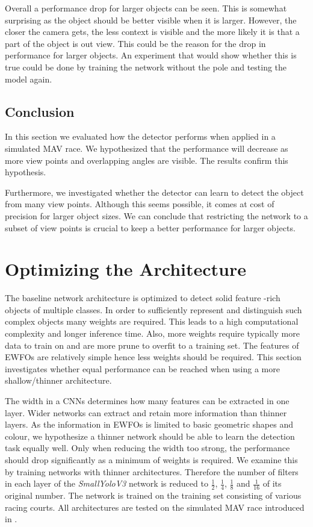 Overall a performance drop for larger objects can be seen. This is somewhat surprising as the object should be better visible when it is larger. However, the closer the camera gets, the less context is visible and the more likely it is that a part of the object is out view. This could be the reason for the drop in performance for larger objects. An experiment that would show whether this is true could be done by training the network without the pole and testing the model again.

\subsection{Conclusion}

In this section we evaluated how the detector performs when applied in a simulated \ac{MAV} race. We hypothesized that the performance will decrease as more view points and overlapping angles are visible. The results confirm this hypothesis.

Furthermore, we investigated whether the detector can learn to detect the object from many view points. Although this seems possible, it comes at cost of precision for larger object sizes. We can conclude that restricting the network to a subset of view points is crucial to keep a better performance for larger objects.



\section{Optimizing the Architecture}
\label{sec:exp_arch}
The baseline network architecture is optimized to detect solid feature -rich objects of multiple classes. In order to sufficiently represent and distinguish such complex objects many weights are required. This leads to a high computational complexity and longer inference time. Also, more weights require typically more data to train on and are more prune to overfit to a training set. The features of \acp{EWFO} are relatively simple hence less weights should be required. This section investigates whether equal performance can be reached when using a more shallow/thinner architecture.

The width in a \acp{CNN} determines how many features can be extracted in one layer. Wider networks can extract and retain more information than thinner layers. As the information in \acp{EWFO} is limited to basic geometric shapes and colour, we hypothesize a thinner network should be able to learn the detection task equally well. Only when reducing the width too strong, the performance should drop significantly as a minimum of weights is required. We examine this by training networks with thinner architectures. Therefore the number of filters in each layer of the \textit{SmallYoloV3} network is reduced to $\frac{1}{2}$, $\frac{1}{4}$, $\frac{1}{8}$ and $\frac{1}{16}$ of its original number. The network is trained on the training set consisting of various racing courts. All architectures are tested on the simulated \ac{MAV} race introduced in .

